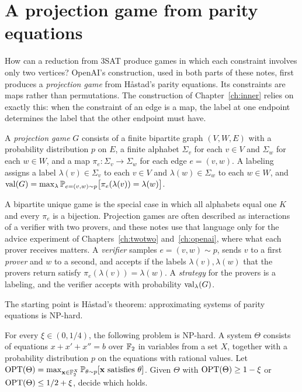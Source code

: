 \chapter{A projection game from parity equations}\label{ch:outer}

How can a reduction from 3SAT produce games in which each constraint involves only two vertices? OpenAI's construction, used in both parts of these notes, first produces a \emph{projection game} from H\aa stad's parity equations. Its constraints are maps rather than permutations. The construction of Chapter~\ref{ch:inner} relies on exactly this: when the constraint of an edge is a map, the label at one endpoint determines the label that the other endpoint must have.

\begin{definition}\label{def:projection}
A \emph{projection game} $G$ consists of a finite bipartite graph $(V,W,E)$ with a probability distribution $p$ on $E$, a finite alphabet $\Sigma_v$ for each $v\in V$ and $\Sigma_w$ for each $w\in W$, and a map $\pi_e:\Sigma_v\to\Sigma_w$ for each edge $e=(v,w)$. A labeling assigns a label $\lambda(v)\in\Sigma_v$ to each $v\in V$ and $\lambda(w)\in\Sigma_w$ to each $w\in W$, and $\operatorname{val}(G)=\max_\lambda\mathbb{P}_{e=(v,w)\sim p}\bigl[\pi_e(\lambda(v))=\lambda(w)\bigr]$.
\end{definition}

A bipartite unique game is the special case in which all alphabets equal one $K$ and every $\pi_e$ is a bijection. Projection games are often described as interactions of a verifier with two provers, and these notes use that language only for the advice experiment of Chapters~\ref{ch:twotwo} and~\ref{ch:openai}, where what each prover receives matters. A \emph{verifier} samples $e=(v,w)\sim p$, sends $v$ to a first \emph{prover} and $w$ to a second, and accepts if the labels $\lambda(v),\lambda(w)$ that the provers return satisfy $\pi_e(\lambda(v))=\lambda(w)$. A \emph{strategy} for the provers is a labeling, and the verifier accepts with probability $\operatorname{val}_\lambda(G)$.

The starting point is H\aa stad's theorem: approximating systems of parity equations is NP-hard.

\begin{theorem}\label{thm:hastad}
For every $\xi\in(0,1/4)$, the following problem is NP-hard. A system $\Theta$ consists of equations $x+x'+x''=b$ over $\mathbb{F}_2$ in variables from a set $X$, together with a probability distribution $p$ on the equations with rational values. Let $\operatorname{OPT}(\Theta)=\max_{\mathbf x\in\mathbb{F}_2^X}\mathbb{P}_{\theta\sim p}[\mathbf x\text{ satisfies }\theta]$. Given $\Theta$ with $\operatorname{OPT}(\Theta)\ge1-\xi$ or $\operatorname{OPT}(\Theta)\le1/2+\xi$, decide which holds.
\end{theorem}


